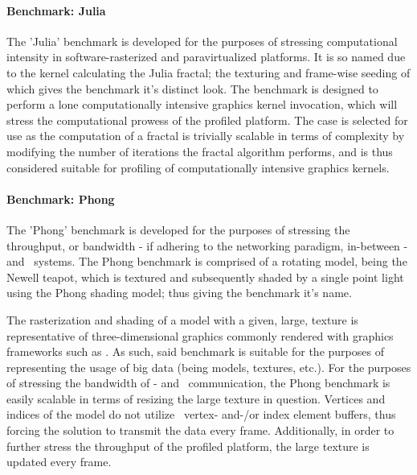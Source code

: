 \paragraph{Benchmark: Julia}
\label{par:experimentalmethodology_benchmarking_benchmarkjulia}
The 'Julia' benchmark is developed for the purposes of stressing computational intensity in software-rasterized and paravirtualized platforms.
It is so named due to the kernel calculating the Julia fractal; the texturing and frame-wise seeding of which gives the benchmark it's distinct look.
The benchmark is designed to perform a lone computationally intensive graphics kernel invocation, which will stress the computational prowess of the profiled platform.
The case is selected for use as the computation of a fractal is trivially scalable in terms of complexity by modifying the number of iterations the fractal algorithm performs, and is thus considered suitable for profiling of computationally intensive graphics kernels.

\paragraph{Benchmark: Phong}
\label{par:experimentalmethodology_benchmarking_benchmarkphong}
The 'Phong' benchmark is developed for the purposes of stressing the throughput, or bandwidth - if adhering to the networking paradigm, in-between \dvttermtarget - and \dvttermhost\ systems.
The Phong benchmark is comprised of a rotating model, being the Newell teapot, which is textured and subsequently shaded by a single point light using the Phong shading model; thus giving the benchmark it's name. %

The rasterization and shading of a model with a given, large, texture is representative of three-dimensional graphics commonly rendered with graphics frameworks such as \dvttermopenglestwopointo .
As such, said benchmark is suitable for the purposes of representing the usage of big data (being models, textures, etc.).
For the purposes of stressing the bandwidth of \dvttermtarget - and \dvttermhost\ communication, the Phong benchmark is easily scalable in terms of resizing the large texture in question.
Vertices and indices of the model do not utilize \dvttermopengl\ vertex- and-/or index element buffers, thus forcing the solution to transmit the data every frame.
Additionally, in order to further stress the throughput of the profiled platform, the large texture is updated every frame.

